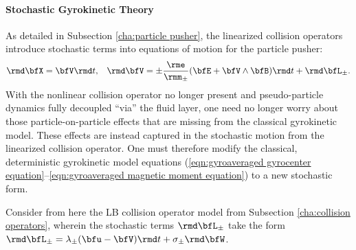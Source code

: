 \paragraph*{Stochastic Gyrokinetic Theory}
    As detailed in Subsection \ref{cha:particle pusher}, the linearized collision operators introduce stochastic terms into equations of motion for the particle pusher:
    \begin{align}
        \rmd\bfX  =  \bfV\rmd t,  &&
        \rmd\bfV  =  \pm\frac{\rme}{\rmm_{\pm}}(\bfE + \bfV\wedge\bfB)\rmd t + \rmd\bfL_{\pm}.
    \end{align}
    With the nonlinear collision operator no longer present and pseudo-particle dynamics fully decoupled ``via'' the fluid layer, one need no longer worry about those particle-on-particle effects that are missing from the classical gyrokinetic model. These effects are instead captured in the stochastic motion from the linearized collision operator. One must therefore modify the classical, deterministic gyrokinetic model equations (\ref{eqn:gyroaveraged gyrocenter equation}--\ref{eqn:gyroaveraged magnetic moment equation}) to a new stochastic form.

    Consider from here the LB collision operator model from Subsection \ref{cha:collision operators}, wherein the stochastic terms $\rmd\bfL_{\pm}$ take the form $\rmd\bfL_{\pm}  =  \lambda_{\pm}(\bfu - \bfV)\rmd t + \sigma_{\pm}\rmd\bfW$.
    
